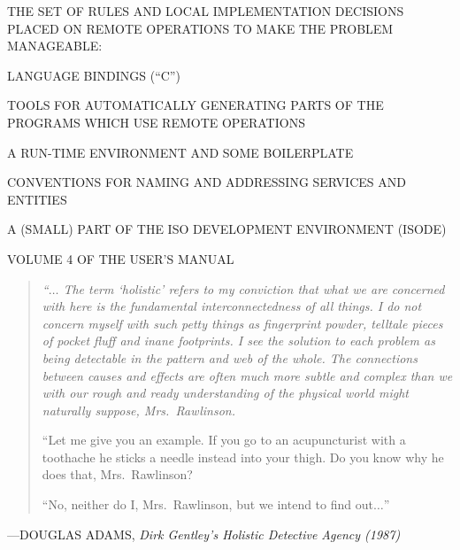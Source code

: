 \begin{bwslide}

\begin{nrtc}
\item	THE SET OF RULES AND LOCAL IMPLEMENTATION DECISIONS PLACED ON REMOTE
	OPERATIONS TO MAKE THE PROBLEM MANAGEABLE:
    \begin{nrtc}
    \item	LANGUAGE BINDINGS (``C'')

    \item	TOOLS FOR AUTOMATICALLY GENERATING PARTS OF THE
		PROGRAMS WHICH USE REMOTE OPERATIONS

    \item	A RUN-TIME ENVIRONMENT AND SOME BOILERPLATE

    \item	CONVENTIONS FOR NAMING AND ADDRESSING SERVICES AND ENTITIES
    \end{nrtc}

\item	A (SMALL) PART OF THE ISO DEVELOPMENT ENVIRONMENT (ISODE)
    \begin{nrtc}
    \item	VOLUME 4 OF THE USER'S MANUAL
    \end{nrtc}
\end{nrtc}
\end{bwslide}


\begin{bwslide}

\begin{quote}\em
``$\ldots$ The term `holistic' refers to my conviction that what we are
concerned with here is the fundamental interconnectedness of all things.
I do not concern myself with such petty things as fingerprint powder, telltale
pieces of pocket fluff and inane footprints.
I see the solution to each problem as being detectable in the pattern and web
of the whole.
The connections between causes and effects are often much more subtle and
complex than we with our rough and ready understanding of the physical world
might naturally suppose, Mrs.~Rawlinson.

``Let me give you an example.
If you go to an acupuncturist with a toothache he sticks a needle instead into
your thigh.
Do you know why he does that, Mrs.~Rawlinson?

``No, neither do I, Mrs.~Rawlinson, but we intend to find out$\ldots$''
\end{quote}

\raggedright
---DOUGLAS ADAMS, \em Dirk Gentley's Holistic Detective Agency (1987)
\end{bwslide}


